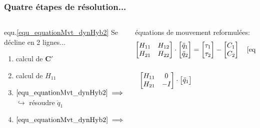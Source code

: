\documentclass[11pt]{beamer}
\begin{document}
\begin{frame}

  \frametitle{Quatre étapes de résolution...}
  
  \begin{columns}[t]
  \begin{column}{.6\textwidth}
    equ.\eqref{equ_equationMvt_dynHyb2} Se décline en 2 lignes... \bigskip \\
    \begin{enumerate}
    \item <3-> calcul de $\boldsymbol{C'}$
    \item <3-> calcul de $H_{11}$
    \item <1-> ${\eqref{equ_equationMvt_dynHyb2} \implies H_{11} \boldsymbol{\ddot{q}_1 = \tau_1 - C'_1}}$ \\
    $\hookrightarrow$ résoudre $\ddot{q}_1$
    \item <2-> $\eqref{equ_equationMvt_dynHyb2} \implies \boldsymbol{\tau_2 = C'_2} + H_{21} \boldsymbol{\ddot{q}_1}$
    \end{enumerate}
  \end{column}
  \begin{column}{.37\textwidth}
  	\begin{block}{équations de mouvement reformulées:}\tiny
	  \begin{align*}
	  	\begin{bmatrix}
		  H_{11} & H_{12} \\
		  H_{21} & H_{22}
		\end{bmatrix} 
		\cdot
		\begin{bmatrix}
		  \ddot{q}_{1} \\
		  \ddot{q}_{2}
		\end{bmatrix} 
		&= 
		\begin{bmatrix}
		  \tau_{1} \\
		  \tau_{2}
		\end{bmatrix} 
		-
		\begin{bmatrix}
		  C_{1} \\
		  C_{2}
		\end{bmatrix} \quad \eqref{equ_local_eqMvt_2} \\
		\notag \\
		\begin{bmatrix}
		  H_{11} & 0 \\
		  H_{21} &  -I
		\end{bmatrix} 
		\cdot
		\begin{bmatrix}
		  \ddot{q}_1 \\

\end{bmatrix}
\end{align*}
\end{block}
\end{column}
\end{columns}
\end{frame}
\end{document}
